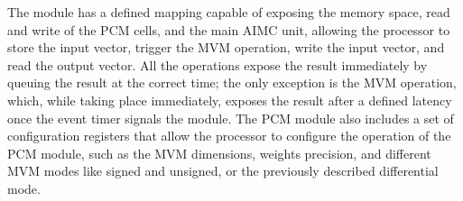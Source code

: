 The module has a defined mapping capable of exposing the memory space, read and write of the PCM cells, and the main AIMC unit, allowing the processor to store the input vector, trigger the MVM operation, write the input vector, and read the output vector.
All the operations expose the result immediately by queuing the result at the correct time; the only exception is the MVM operation, which, while taking place immediately, exposes the result after a defined latency once the event timer signals the module.
The PCM module also includes a set of configuration registers that allow the processor to configure the operation of the PCM module, such as the MVM dimensions, weights precision, and different MVM modes like signed and unsigned, or the previously described differential mode.
